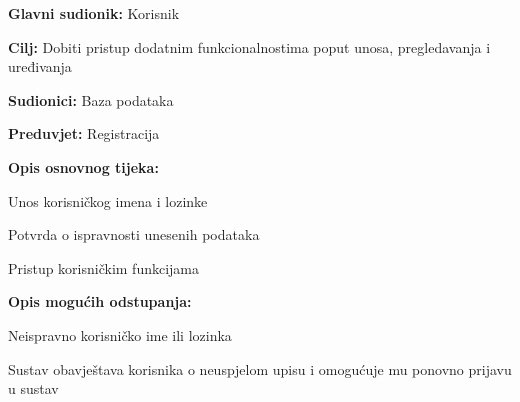\noindent {}
\begin{packed_item}

	\item \textbf{Glavni sudionik: } Korisnik
	\item  \textbf{Cilj:} Dobiti pristup dodatnim funkcionalnostima poput unosa, pregledavanja i uređivanja
	\item  \textbf{Sudionici:} Baza podataka
	\item  \textbf{Preduvjet:} Registracija
	\item  \textbf{Opis osnovnog tijeka:}

	\item[] \begin{packed_enum}

		\item Unos korisničkog imena i lozinke
		\item Potvrda o ispravnosti unesenih podataka
		\item Pristup korisničkim funkcijama

	\end{packed_enum}

	\item  \textbf{Opis mogućih odstupanja:}

	\item[] \begin{packed_item}

		\item[1.a] Neispravno korisničko ime ili lozinka

		\item[] \begin{packed_enum}

			\item Sustav obavještava korisnika o neuspjelom upisu i omogućuje mu ponovno prijavu u sustav

		\end{packed_enum}

	\end{packed_item}
\end{packed_item}

